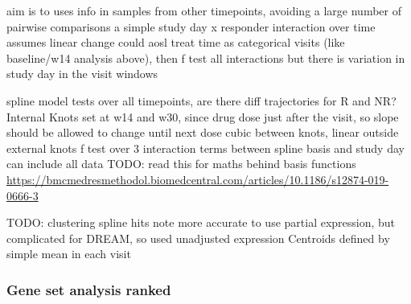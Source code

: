 \begin{outline}
\1 aim is to uses info in samples from other timepoints, avoiding a large number of pairwise comparisons
    \2 a simple study day x responder interaction over time assumes linear change
\1 could aosl treat time as categorical visits (like baseline/w14 analysis above), then f test all interactions
    \2 but there is variation in study day in the visit windows

\1 spline model tests over all timepoints, are there diff trajectories for R and NR?
    \2 Internal Knots set at w14 and w30, since drug dose just after the visit, so slope should be allowed to change until next dose
    \2 cubic between knots, linear outside external knots
    \2 f test over 3 interaction terms between spline basis and study day
        \3 can include all data
        \3 TODO: read this for maths behind basis functions \url{https://bmcmedresmethodol.biomedcentral.com/articles/10.1186/s12874-019-0666-3}



\1 TODO: clustering spline hits
    \2 note more accurate to use partial expression, but complicated for DREAM, so used unadjusted expression
    \2 Centroids defined by simple mean in each visit

\subsubsection{Gene set analysis ranked}


\end{outline}
